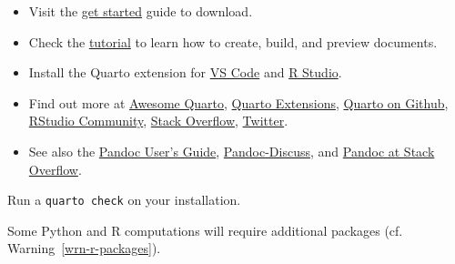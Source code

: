 \documentclass[
  10pt,
  oneside,
  cleardoublepage=empty,
  numbers=noenddot,
  titlepage,
  toclink=all,
  toc=bibliography,
  headinclude,
  footinclude]{scrbook}
\providecommand{\tightlist}{%
  \setlength{\itemsep}{0pt}\setlength{\parskip}{0pt}}\usepackage{longtable,booktabs,array}
\theoremstyle{plain}
\theoremstyle{plain}
\theoremstyle{definition}
\theoremstyle{definition}
\theoremstyle{plain}
\theoremstyle{plain}
\theoremstyle{definition}
\theoremstyle{plain}
\theoremstyle{remark}
\begin{document}
\begin{tcolorbox}[enhanced jigsaw, bottomrule=.15mm, bottomtitle=1mm, rightrule=.15mm, opacityback=0, coltitle=black, colback=white, left=2mm, arc=.35mm, colbacktitle=quarto-callout-tip-color!10!white, breakable, toptitle=1mm, colframe=quarto-callout-tip-color-frame, toprule=.15mm, titlerule=0mm, title=\textcolor{quarto-callout-tip-color}{\faLightbulb}\hspace{0.5em}{New to Quarto?}, leftrule=.75mm, opacitybacktitle=0.6]

\begin{itemize}
\tightlist
\item
  Visit the \href{https://quarto.org/docs/get-started/}{get started}
  guide to download.
\item
  Check the
  \href{https://quarto.org/docs/get-started/hello/vscode.html}{tutorial}
  to learn how to create, build, and preview documents.
\item
  Install the Quarto extension for
  \href{https://quarto.org/docs/get-started/\#quarto-for-vs-code}{VS
  Code} and
  \href{https://quarto.org/docs/get-started/\#quarto-for-rstudio}{R
  Studio}.
\item
  Find out more at
  \href{https://github.com/mcanouil/awesome-quarto}{Awesome Quarto},
  \href{https://github.com/quarto-ext?type=source}{Quarto Extensions},
  \href{https://github.com/search?q=topic\%3Aquarto&type=repositories}{Quarto
  on Github}, \href{https://community.rstudio.com/tags/quarto}{RStudio
  Community},
  \href{https://stackoverflow.com/questions/tagged/quarto}{Stack
  Overflow}, \href{https://twitter.com/quarto_pub}{Twitter}.
\item
  See also the \href{https://pandoc.org/MANUAL.html}{Pandoc User's
  Guide},
  \href{https://github.com/jgm/pandoc/discussions}{Pandoc-Discuss}, and
  \href{https://stackoverflow.com/questions/tagged/pandoc}{Pandoc at
  Stack Overflow}.
\end{itemize}

\end{tcolorbox}

\begin{tcolorbox}[enhanced jigsaw, bottomrule=.15mm, bottomtitle=1mm, rightrule=.15mm, opacityback=0, coltitle=black, colback=white, left=2mm, arc=.35mm, colbacktitle=quarto-callout-important-color!10!white, breakable, toptitle=1mm, colframe=quarto-callout-important-color-frame, toprule=.15mm, titlerule=0mm, title=\textcolor{quarto-callout-important-color}{\faExclamation}\hspace{0.5em}{Installation issues}, leftrule=.75mm, opacitybacktitle=0.6]

Run a \texttt{quarto\ check} on your installation.

Some Python and R computations will require additional packages (cf.
\label{cite_1}{\label{cite_1}Warning~\ref{wrn-r-packages}}).

\end{tcolorbox}
\end{document}
